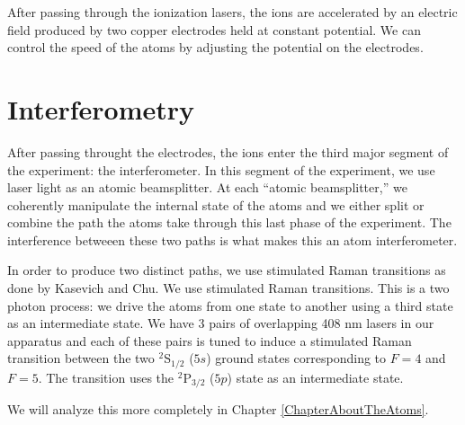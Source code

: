 After passing through the ionization lasers, the ions are accelerated by an electric field produced by two copper electrodes held at constant potential. We can control the speed of the atoms by adjusting the potential on the electrodes.%

\section{Interferometry}

After passing throught the electrodes, the ions enter the third major segment of the experiment: the interferometer. In this segment of the experiment, we use laser light as an atomic beamsplitter. At each ``atomic beamsplitter,'' we coherently manipulate the internal state of the atoms and we either split or combine the path the atoms take through this last phase of the experiment. The interference betweeen these two paths is what makes this an atom interferometer.

In order to produce two distinct paths, we use stimulated Raman transitions as done by Kasevich and Chu\cite{kasevichChu1991}. We use stimulated Raman transitions. This is a two photon process: we drive the atoms from one state to another using a third state as an intermediate state. We have 3 pairs of overlapping 408 nm lasers in our apparatus and each of these pairs is tuned to induce a stimulated Raman transition between the two $^2$S$_{1/2}$ ($5s$) ground states corresponding to $F=4$ and $F=5$. The transition uses the $^2$P$_{3/2}$ ($5p$) state as an intermediate state. 


We will analyze this more completely in Chapter \ref{ChapterAboutTheAtoms}.




